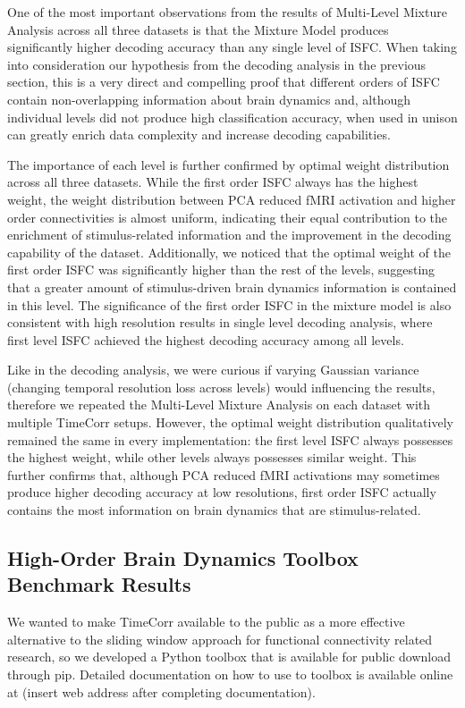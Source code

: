 \documentclass[11pt]{article}
\begin{document}
One of the most important observations from the results of Multi-Level Mixture Analysis across all three datasets is that the Mixture Model produces significantly higher decoding accuracy than any single level of ISFC. When taking into consideration our hypothesis from the decoding analysis in the previous section, this is a very direct and compelling proof that different orders of ISFC contain non-overlapping information about brain dynamics and, although individual levels did not produce high classification accuracy, when used in unison can greatly enrich data complexity and increase decoding capabilities.

The importance of each level is further confirmed by optimal weight distribution across all three datasets. While the first order ISFC always has the highest weight, the weight distribution between PCA reduced fMRI activation and higher order connectivities is almost uniform, indicating their equal contribution to the enrichment of stimulus-related information and the improvement in the decoding capability of the dataset. Additionally, we noticed that the optimal weight of the first order ISFC was significantly higher than the rest of the levels, suggesting that a greater amount of stimulus-driven brain dynamics information is contained in this level. The significance of the first order ISFC in the mixture model is also consistent with high resolution results in single level decoding analysis, where first level ISFC achieved the highest decoding accuracy among all levels.

Like in the decoding analysis, we were curious if varying Gaussian variance (changing temporal resolution loss across levels) would influencing the results, therefore we repeated the Multi-Level Mixture Analysis on each dataset with multiple TimeCorr setups. However, the optimal weight distribution qualitatively remained the same in every implementation: the first level ISFC always possesses the highest weight, while other levels always possesses similar weight. This further confirms that, although PCA reduced fMRI activations may sometimes produce higher decoding accuracy at low resolutions, first order ISFC actually contains the most information on brain dynamics that are stimulus-related.

\subsection{High-Order Brain Dynamics Toolbox Benchmark Results}
We wanted to make TimeCorr available to the public as a more effective alternative to the sliding window approach for functional connectivity related research, so we developed a Python toolbox that is available for public download through pip. Detailed documentation on how to use to toolbox is available online at (insert web address after completing documentation).
\end{document}
